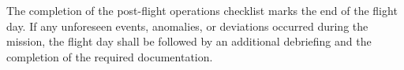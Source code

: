 The completion of the post-flight operations checklist marks the end of the flight day. If any unforeseen events, anomalies, or deviations occurred during the mission, the flight day shall be followed by an additional debriefing and the completion of the required documentation.


